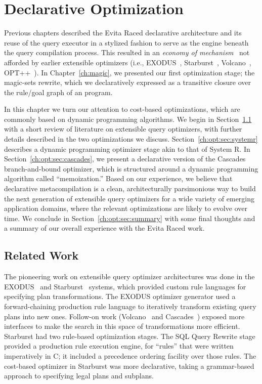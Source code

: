 \chapter[Declarative Optimization]{Declarative Optimization}
\label{ch:opt}

Previous chapters described the Evita Raced declarative architecture and its
reuse of the query executor in a stylized fashion to serve as the engine
beneath the query compilation process.  This resulted in an {\em economy of
mechanism}~\cite{Saltzer75theprotection} not afforded by earlier extensible
optimizers (i.e., EXODUS~\cite{exodus}, Starburst~\cite{phh92},
Volcano~\cite{volcano}, OPT++~\cite{opt++}).  In Chapter~\ref{ch:magic}, we
presented our first optimization stage; the magic-sets rewrite, which we
declaratively expressed as a transitive closure over the rule/goal graph of an
\OVERLOG program.

In this chapter we turn our attention to cost-based optimizations, which are
commonly based on dynamic programming algorithms.  We begin in
Section~\ref{ch:opt:sec:related} with a short review of literature on
extensible query optimizers, with further details described in the two
optimizations we discuss.  Section~\ref{ch:opt:sec:systemr} describes a dynamic
programming optimizer stage akin to that of System R.  In
Section~\ref{ch:opt:sec:cascades}, we present a declarative version of the
Cascades branch-and-bound optimizer, which is structured around a dynamic
programming algorithm called ``memoization.'' Based on our experience, we
believe that declarative metacompilation is a clean, architecturally
parsimonious way to build the next generation of extensible query optimizers
for a wide variety of emerging application domains, where the relevant
optimizations are likely to evolve over time.  We conclude in
Section~\ref{ch:opt:sec:summary} with some final thoughts and a summary of our
overall experience with the Evita Raced work.

\section{Related Work}
\label{ch:opt:sec:related}

The pioneering work on extensible query optimizer architectures was done in the
EXODUS~\cite{exodus} and Starburst~\cite{lohman,phh92} systems, which provided
custom rule languages for specifying plan transformations.  The EXODUS
optimizer generator used a forward-chaining production rule language to iteratively
transform existing query plans into new ones.  Follow-on work
(Volcano~\cite{volcano} and Cascades~\cite{cascades}) exposed more interfaces
to make the search in this space of transformations more efficient.  Starburst
had two rule-based optimization stages.  The SQL Query Rewrite stage provided a
production rule execution engine, for ``rules'' that were written imperatively
in C; it included a precedence ordering facility over those rules.  The
cost-based optimizer in Starburst was more declarative, taking a grammar-based
approach to specifying legal plans and subplans.

